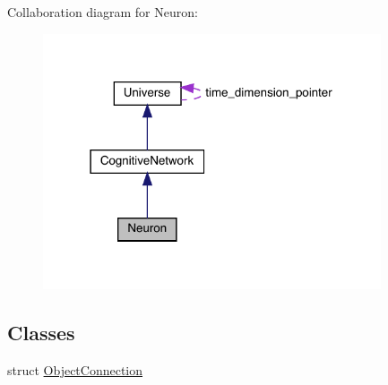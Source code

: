 Collaboration diagram for Neuron\+:
\nopagebreak
\begin{figure}[H]
\begin{center}
\leavevmode
\includegraphics[width=283pt]{class_neuron__coll__graph}
\end{center}
\end{figure}
\subsection*{Classes}
\begin{DoxyCompactItemize}
\item 
struct \hyperlink{struct_neuron_1_1_object_connection}{Object\+Connection}
\end{DoxyCompactItemize}
